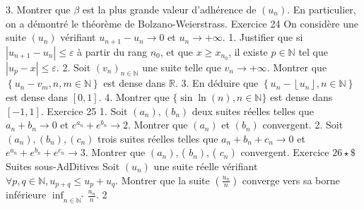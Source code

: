 \documentclass[a4paper,11pt]{article}
\theoremstyle{definition}
\begin{document}
3. Montrer que $\beta$ est la plus grande valeur d'adhérence de $\left(u_n\right)$.
En particulier, on a démontré le théorème de Bolzano-Weierstrass.
Exercice 24 On considère une suite $\left(u_n\right)$ vérifiant $u_{n+1}-u_n \rightarrow 0$ et $u_n \rightarrow+\infty$.
1. Justifier que si $\left|u_{n+1}-u_n\right| \leq \varepsilon$ à partir du rang $n_0$, et que $x \geq x_{n_0}$, il existe $p \in \mathbb{N}$ tel que $\left|u_p-x\right| \leq \varepsilon$.
2. Soit $\left(v_n\right)_{n \in \mathbb{N}}$ une suite telle que $v_n \rightarrow+\infty$. Montrer que $\left\{u_n-v_m, n, m \in \mathbb{N}\right\}$ est dense dans $\mathbb{R}$.
3. En déduire que $\left\{u_n-\left\lfloor u_n\right\rfloor, n \in \mathbb{N}\right\}$ est dense dans $[0,1]$.
4. Montrer que $\{\sin \ln (n), n \in \mathbb{N}\}$ est dense dans $[-1,1]$.
Exercice 25 1. Soit $\left(a_n\right),\left(b_n\right)$ deux suites réelles telles que $a_n+b_n \rightarrow 0$ et $e^{a_n}+e^{b_n} \rightarrow 2$. Montrer que $\left(a_n\right)$ et $\left(b_n\right)$ convergent.
2. Soit $\left(a_n\right),\left(b_n\right),\left(c_n\right)$ trois suites réelles telles que $a_n+b_n+c_n \rightarrow 0$ et $e^{a_n}+e^{b_n}+e^{c_n} \rightarrow 3$. Montrer que $\left(a_n\right)$, ( $\left.b_n\right)$, ( $\left.c_n\right)$ convergent.
Exercice $26 \star \$$ Suites sous-AdDitives Soit $\left(u_n\right)$ une suite réelle vérifiant $\forall p, q \in \mathbb{N}, u_{p+q} \leq u_p+u_q$. Montrer que la suite $\left(\frac{u_n}{n}\right)$ converge vers sa borne inférieure $\inf _{n \in \mathbb{N}^*} \frac{u_n}{n}$.
2
\end{document}
